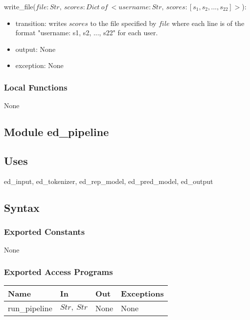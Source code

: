 \documentclass[12pt, titlepage]{article}
\begin{document}
\noindent write\_file($file: Str,\ scores: Dict\ of\ <username: Str,\ scores: [s_1, s_2, ..., s_{22}]>$):
\begin{itemize}
\item transition: writes $scores$ to the file specified by $file$ where each line is of the format "username: s1, s2, ..., s22" for each user.
\item output: None
\item exception: None
\end{itemize}

\subsubsection{Local Functions}

None


\subsection{Module ed\_pipeline}

\subsection{Uses}

ed\_input, ed\_tokenizer, ed\_rep\_model, ed\_pred\_model, ed\_output

\subsection{Syntax}

\subsubsection{Exported Constants}

None

\subsubsection{Exported Access Programs}

\begin{center}
\begin{tabular}{p{3cm} p{4cm} p{4cm} p{3cm}}
\hline
\textbf{Name} & \textbf{In} & \textbf{Out} & \textbf{Exceptions} \\
\hline
run\_pipeline & $Str,\ Str$ & None & None \\
\hline
\end{tabular}
\end{center}
\end{document}
